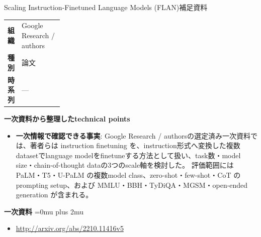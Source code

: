 \begin{technicalnote}{Scaling Instruction-Finetuned Language Models (FLAN)}{補足資料}
\begingroup
\begin{tabularx}{\linewidth}{@{}>{\bfseries}p{0.22\linewidth}X@{}}
組織 & Google Research / authors \\
種別 & 論文 \\
時系列 & — \\
\end{tabularx}
\smallskip
{\bfseries 一次資料から整理したtechnical points}
\begin{itemize}[leftmargin=1.5em,itemsep=0.35em]
\item \textbf{一次情報で確認できる事実}: Google Research / authorsの選定済み一次資料では、著者らは instruction finetuning を、instruction形式へ変換した複数datasetでlanguage modelをfinetuneする方法として扱い、task数・model size・chain-of-thought dataの3つのscale軸を検討した。 評価範囲には PaLM・T5・U-PaLM の複数model class、zero-shot・few-shot・CoT のprompting setup、および MMLU・BBH・TyDiQA・MGSM・open-ended generation が含まれる。
\end{itemize}
\begin{minipage}{\linewidth}
\begin{samepage}
{\bfseries 一次資料}
\begingroup\sloppy
\Urlmuskip=0mu plus 2mu\relax
\begin{itemize}[leftmargin=1.5em,itemsep=0.25em]
\item {\scriptsize\url{http://arxiv.org/abs/2210.11416v5}}
\end{itemize}
\endgroup
\end{samepage}
\end{minipage}
\endgroup
\end{technicalnote}
\medskip

